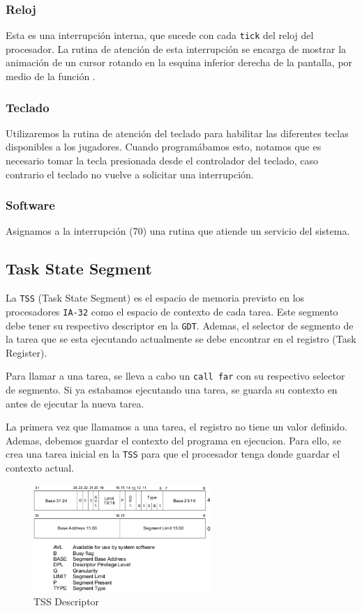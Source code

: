\subsubsection{Reloj}

Esta es una interrupción interna, que sucede con cada \texttt{tick} del reloj del procesador. La rutina de atención de esta interrupción se encarga de mostrar la animación de un cursor rotando en la esquina inferior derecha de la pantalla, por medio de la función .

\subsubsection{Teclado}
Utilizaremos la rutina de atención del teclado para habilitar las diferentes teclas disponibles a los jugadores. Cuando programábamos esto, notamos que es necesario tomar la tecla presionada desde el controlador del teclado, caso contrario el teclado no vuelve a solicitar una interrupción.

\subsubsection{Software}
Asignamos a la interrupción  (70) una rutina que atiende un servicio del sistema.

\subsection{Task State Segment}

La \texttt{TSS} (Task State Segment) es el espacio de memoria previsto en los procesadores \texttt{IA-32} como el espacio de contexto de cada tarea. Este segmento debe tener su respectivo descriptor en la \texttt{GDT}. Ademas, el selector de segmento de la tarea que se
esta ejecutando actualmente se debe encontrar en el registro  (Task Register).

Para llamar a una tarea, se lleva a cabo un \texttt{call far} con su respectivo selector de segmento. Si ya estabamos ejecutando una tarea, se guarda su contexto en  antes de ejecutar la nueva tarea. 

La primera vez que llamamos a una tarea, el registro  no tiene un valor definido. Ademas, debemos guardar el contexto del programa en ejecucion. Para ello, se crea una tarea inicial  en la \texttt{TSS} para que el procesador tenga donde guardar el contexto actual.

\begin{figure}[H]
  \centering
    \includegraphics[width=0.6\textwidth]{images/tss_descriptor}
  \caption{TSS Descriptor}
\end{figure}

